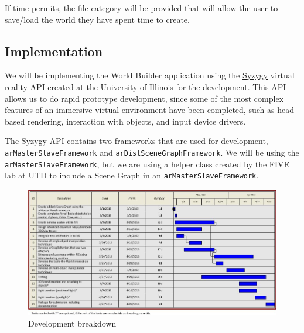 If time permits, the file category will be provided that will allow the user to save/load the world they have spent time to create.

\subsection{Implementation}
We will be implementing the World Builder application using the \href{http://syzygy.isl.uiuc.edu/szg/szgsrc/doc/index.html}{Syzygy} virtual reality API created at the University of Illinois for the development.
This API allows us to do rapid prototype development, since some of the most complex features of an immersive virtual environment have been completed, such as head based rendering, interaction with objects, and input device drivers.

The Syzygy API contains two frameworks that are used for development, \verb|arMasterSlaveFramework| and \verb|arDistSceneGraphFramework|.
We will be using the \verb|arMasterSlaveFramework|, but we are using a helper class created by the FIVE lab at UTD to include a Scene Graph in an \verb|arMasterSlaveFramework|.

\begin{landscape}
	\begin{figure}[htbp]
		\label{fig:gantt}
		\includegraphics{figs/gantt_chart.jpg}
		\caption{Development breakdown}
	\end{figure}
\end{landscape}
